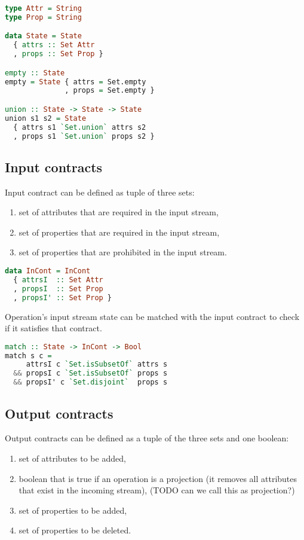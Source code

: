 \begin{lstlisting}[language=Haskell]
type Attr = String
type Prop = String

data State = State
  { attrs :: Set Attr
  , props :: Set Prop }

empty :: State
empty = State { attrs = Set.empty
              , props = Set.empty }

union :: State -> State -> State
union s1 s2 = State
  { attrs s1 `Set.union` attrs s2
  , props s1 `Set.union` props s2 }
\end{lstlisting}

\subsection{Input contracts}

Input contract can be defined as tuple of three sets:
\begin{enumerate}
    \item set of attributes that are required in the input stream,
    \item set of properties that are required in the input stream,
    \item set of properties that are prohibited in the input stream.
\end{enumerate}

\begin{lstlisting}[language=Haskell]
data InCont = InCont
  { attrsI  :: Set Attr
  , propsI  :: Set Prop
  , propsI' :: Set Prop }
\end{lstlisting}

Operation's input stream state can be matched with the input contract to check if it satisfies that contract.

\begin{lstlisting}[language=Haskell]
match :: State -> InCont -> Bool
match s c =
     attrsI c `Set.isSubsetOf` attrs s
  && propsI c `Set.isSubsetOf` props s
  && propsI' c `Set.disjoint`  props s
\end{lstlisting}

\subsection{Output contracts}

Output contracts can be defined as a tuple of the three sets and one boolean:
\begin{enumerate}
    \item set of attributes to be added,
    \item boolean that is true if an operation is a projection (it removes all attributes that exist in the incoming stream), (TODO can we call this as projection?)
    \item set of properties to be added,
    \item set of properties to be deleted.
\end{enumerate}

